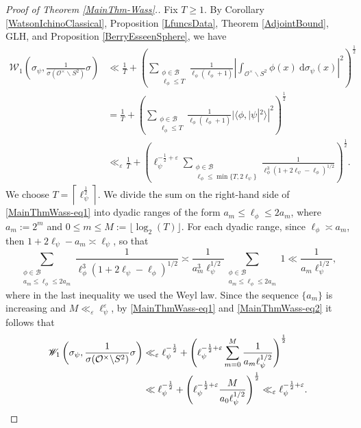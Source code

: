 \documentclass[11pt]{amsart}
\theoremstyle{definition}
\begin{document}
\begin{proof}[Proof of Theorem \ref{MainThm-Wass}.]
Fix $T\geq 1$. By Corollary \ref{WatsonIchinoClassical}, Proposition \ref{LfuncsData}, Theorem \ref{AdjointBound}, GLH, and Proposition \ref{BerryEsseenSphere}, we have 
\begin{align}
    \mathscr{W}_{1}\left(\sigma_{\psi}, \frac{1}{\sigma(\mathcal{O}^{\times} \backslash S^2)} \sigma \right) &\ll \frac{1}{T} + \left( \sum_{\substack{\phi \in \mathcal{B} \\ \ell_{\phi} \leq T }} \frac{1}{\ell_{\phi}(\ell_{\phi}+1)} \left| \int_{\mathcal{O}^{\times} \backslash S^2} \phi(x) \: \mathrm{d}\sigma_{\psi}(x) \right|^{2} \right)^{\frac{1}{2}} \label{MainThmWass-eq1} \\
    &= \frac{1}{T} + \left( \sum_{\substack{\phi \in \mathcal{B} \\ \ell_{\phi} \leq T }} \frac{1}{\ell_{\phi}(\ell_{\phi}+1)} |\langle \phi, |\psi|^2\rangle |^{2} \right)^{\frac{1}{2}} \nonumber \\
    &\ll_{\varepsilon} \frac{1}{T} + \left( \ell_{\psi}^{-\frac{1}{2} + \varepsilon} \sum_{\substack{\phi \in \mathcal{B} \\ \ell_{\phi} \leq \min\{T,2\ell_{\psi}\}}} \frac{1}{\ell_{\phi}^3 (1+2\ell_{\psi} - \ell_{\phi})^{1/2}} \right)^{\frac{1}{2}}. \nonumber
\end{align}
We choose $T = \left\lceil \ell_{\psi}^{\frac{1}{2}} \right\rceil$. We divide the sum on the right-hand side of \eqref{MainThmWass-eq1} into dyadic ranges of the form $a_m \leq \ell_{\phi} \leq 2a_m$, where $a_m := 2^m$ and $0\leq m\leq M := \lfloor \log_2(T) \rfloor$. For each dyadic range, since $\ell_{\phi} \asymp a_m$, then $1+2\ell_{\psi}-a_m \asymp \ell_{\psi}$, so that
\begin{equation}
    \sum_{\substack{\phi \in \mathcal{B} \\ a_m \leq \ell_{\phi} \leq 2a_m}} \frac{1}{\ell_{\phi}^3 (1+2\ell_{\psi} - \ell_{\phi})^{1/2}} \asymp \frac{1}{a_{m}^{3} \ell_{\psi}^{1/2}} \sum_{\substack{\phi \in \mathcal{B} \\ a_m \leq \ell_{\phi} \leq 2a_m}} 1 \ll \frac{1}{a_m \ell_{\psi}^{1/2}}, \label{MainThmWass-eq2}
\end{equation}
where in the last inequality we used the Weyl law. Since the sequence $\{a_m\}$ is increasing and $M \ll_{\varepsilon} \ell_{\psi}^{\varepsilon}$, by \eqref{MainThmWass-eq1} and \eqref{MainThmWass-eq2} it follows that 
\begin{align*}
    \mathscr{W}_{1}\left(\sigma_{\psi}, \frac{1}{\sigma(\mathcal{O}^{\times} \backslash S^2)} \sigma \right) &\ll_{\varepsilon} \ell_{\psi}^{-\frac{1}{2}} + \left( \ell_{\psi}^{-\frac{1}{2}+\varepsilon} \sum_{m=0}^{M} \frac{1}{a_{m} \ell_{\psi}^{1/2}} \right)^{\frac{1}{2}} \\
    &\ll \ell_{\psi}^{-\frac{1}{2}} + \left( \ell_{\psi}^{-\frac{1}{2}+\varepsilon} \frac{M}{a_{0}\ell_{\psi}^{1/2}} \right)^{\frac{1}{2}} \ll_{\varepsilon} \ell_{\psi}^{-\frac{1}{2}+\varepsilon}. \qedhere
\end{align*}
\end{proof}
\end{document}
